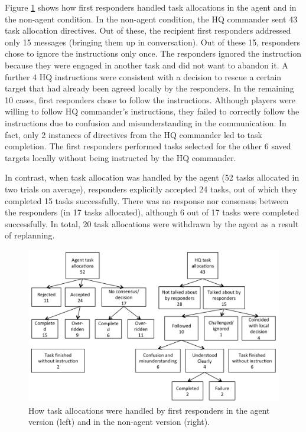 \noindent Figure \ref{fig:msgs} shows how first responders handled task allocations in the agent and in the non-agent condition. In the non-agent condition, the HQ commander sent 43 task allocation directives. Out of these, the recipient first responders addressed only 15 messages (bringing them up in conversation). Out of these 15, responders chose to ignore the instructions only once. The responders ignored the instruction because they were engaged in another task and did not want to abandon it. A further 4 HQ instructions were consistent with a decision to rescue a certain target that had already been agreed locally by the responders. In the remaining 10 cases, first responders chose to follow the instructions. Although players were willing to follow HQ commander's instructions, they failed to correctly follow the instructions due to confusion and misunderstanding in the communication. In fact, only 2 instances of directives from the HQ commander led to task completion. The first responders performed tasks selected for the other 6 saved targets locally without being instructed by the HQ commander.

In contrast, when task allocation was handled by the agent (52 tasks allocated in two trials on average), responders explicitly accepted 24 tasks, out of which they completed 15 tasks successfully. There was no response nor consensus between the responders (in 17 tasks allocated), although 6 out of 17 tasks were completed successfully. In total, 20 task allocations were withdrawn by the agent as a result of replanning. 

\begin{figure}[htbp]
\includegraphics[width=\columnwidth]{message_handling.png}
\vspace{-3mm}
\caption{How task allocations were handled by first responders in the agent version (left) and in the non-agent version (right).\vspace{-3mm}}\label{fig:msgs}
\end{figure}


